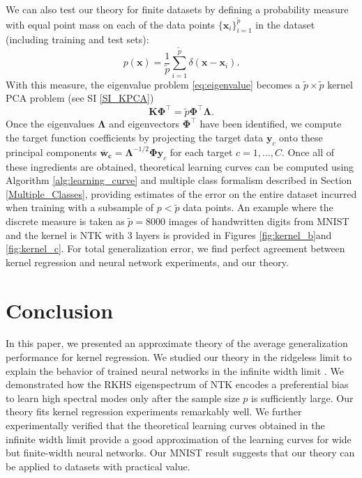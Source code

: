 \documentclass{article}
\begin{document}
We can also test our theory for finite datasets by defining a probability measure with equal point mass on each of the data points $\{\mathbf{x}_i\}_{i=1}^{\tilde{p}}$ in the dataset (including training and test sets):
\begin{equation}
    p(\mathbf{x}) = \frac{1}{\tilde{p}} \sum_{i=1}^{\tilde{p}} \delta(\mathbf{x}-\mathbf{x}_i).
\end{equation}
%
With this measure, the eigenvalue problem \eqref{eq:eigenvalue} becomes a $\tilde{p} \times \tilde{p}$ kernel PCA problem (see SI \ref{SI_KPCA})
\begin{equation}
    \mathbf{K}\bm{\Phi}^{\top} = \tilde{p} \bm{\Phi}^{\top} \bm{\Lambda}.
\end{equation}
%
Once the eigenvalues $\mathbf{\Lambda}$ and eigenvectors $\bm{\Phi}^{\top}$ have been identified, we 
compute the target function coefficients by projecting the target data $\mathbf{y}_c$ onto these principal components $\mathbf{\overline{w}_c} = \bm{\Lambda}^{-1/2} \bm{\Phi} \mathbf{y}_c$ for each target $c=1,\ldots,C$. Once all of these ingredients are obtained, theoretical learning curves can be computed using Algorithm \ref{alg:learning_curve} and  multiple class formalism described in Section \ref{Multiple_Classes}, providing estimates of the error on the entire dataset incurred when training with a subsample of $p < \tilde{p}$ data points. An example where the discrete measure is taken as $\tilde{p} =8000$ images of handwritten digits from MNIST \cite{MNIST} and the kernel is NTK with 3 layers is provided in Figures \ref{fig:kernel_b}and \ref{fig:kernel_c}. For total generalization error, we find perfect agreement between kernel regression and neural network experiments, and our theory.


\section{Conclusion}

In this paper, we presented an approximate theory of the average generalization performance for kernel regression. We studied our theory in the ridgeless limit to explain the behavior of trained neural networks in the infinite width limit \cite{jacot2018neural,arora2019exact,lee2019wide}. We demonstrated how the RKHS eigenspectrum of NTK encodes a preferential bias to learn high spectral modes only after the sample size $p$ is sufficiently large. Our theory fits kernel regression experiments remarkably well. We further experimentally verified that the theoretical learning curves obtained in the infinite width limit provide a good approximation of the learning curves for wide but finite-width neural networks. Our MNIST result suggests that our theory can be applied to datasets with practical value.
\end{document}
